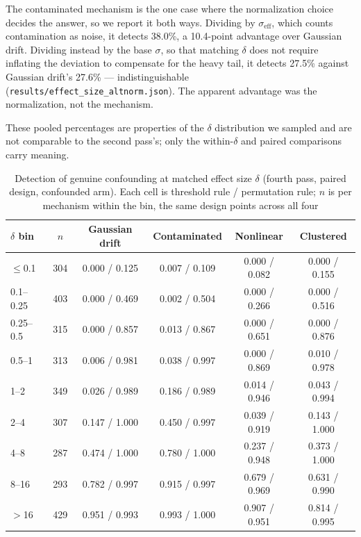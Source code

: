 \documentclass[journal=dce]{CUP-JNL-DTM}%
\begin{document}
The contaminated mechanism is the one case where the normalization choice decides the answer, so we report it both ways. Dividing by $\sigma_{\mathrm{eff}}$, which counts contamination as noise, it detects 38.0\%, a 10.4-point advantage over Gaussian drift. Dividing instead by the base $\sigma$, so that matching $\delta$ does not require inflating the deviation to compensate for the heavy tail, it detects 27.5\% against Gaussian drift's 27.6\% --- indistinguishable (\texttt{results/effect\_size\_altnorm.json}). The apparent advantage was the normalization, not the mechanism.

These pooled percentages are properties of the $\delta$ distribution we sampled and are not comparable to the second pass's; only the within-$\delta$ and paired comparisons carry meaning.

\begin{table}[htbp]
\centering
\caption{Detection of genuine confounding at matched effect size $\delta$ (fourth pass, paired design, confounded arm). Each cell is threshold rule / permutation rule; $n$ is per mechanism within the bin, the same design points across all four}
\label{tab:matched}
\small
\begin{tabular}{lccccc}
\toprule
$\delta$ bin & $n$ & Gaussian drift & Contaminated & Nonlinear & Clustered \\
\midrule
$\leq$0.1   & 304 & 0.000 / 0.125 & 0.007 / 0.109 & 0.000 / 0.082 & 0.000 / 0.155 \\
0.1--0.25   & 403 & 0.000 / 0.469 & 0.002 / 0.504 & 0.000 / 0.266 & 0.000 / 0.516 \\
0.25--0.5   & 315 & 0.000 / 0.857 & 0.013 / 0.867 & 0.000 / 0.651 & 0.000 / 0.876 \\
0.5--1      & 313 & 0.006 / 0.981 & 0.038 / 0.997 & 0.000 / 0.869 & 0.010 / 0.978 \\
1--2        & 349 & 0.026 / 0.989 & 0.186 / 0.989 & 0.014 / 0.946 & 0.043 / 0.994 \\
2--4        & 307 & 0.147 / 1.000 & 0.450 / 0.997 & 0.039 / 0.919 & 0.143 / 1.000 \\
4--8        & 287 & 0.474 / 1.000 & 0.780 / 1.000 & 0.237 / 0.948 & 0.373 / 1.000 \\
8--16       & 293 & 0.782 / 0.997 & 0.915 / 0.997 & 0.679 / 0.969 & 0.631 / 0.990 \\
$>$16       & 429 & 0.951 / 0.993 & 0.993 / 1.000 & 0.907 / 0.951 & 0.814 / 0.995 \\
\bottomrule
\end{tabular}
\end{table}
\end{document}
